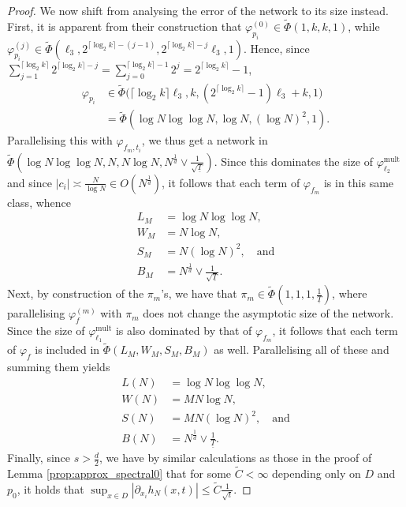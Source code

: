 \documentclass[a4paper, 11pt, headings = small, abstract]{scrartcl}
\begin{document}
\begin{proof}
	We now shift from analysing the error of the network to its size instead.
	First, it is apparent from their construction that $\varphi_{p_i}^{(0)}\in\widetilde{\Phi}(1, k, k, 1)$, while $\varphi_{p_i}^{(j)}\in\widetilde{\Phi}(\ell_3, 2^{\lceil\log_2k\rceil-(j-1)}, 2^{\lceil\log_2k\rceil-j}\ell_3, 1)$.
	Hence, since $\sum_{j=1}^{\lceil\log_2k\rceil}2^{\lceil\log_2k\rceil-j}=\sum_{j=0}^{\lceil\log_2k\rceil-1}2^j=2^{\lceil\log_2k\rceil}-1$,
	\begin{align*}
		\varphi_{p_i}
		&\in\widetilde{\Phi}\Big(\lceil\log_2k\rceil\ell_3, k, (2^{\lceil\log_2k\rceil}-1)\ell_3+k, 1\Big) \\
		&=\widetilde{\Phi}(\log N\log\log N, \log N, (\log N)^2, 1).
	\end{align*}
	Parallelising this with $\varphi_{f_m, t_i}$, we thus get a network in $\widetilde{\Phi}(\log N\log\log N, N, N\log N, N^{\frac{1}{d}}\vee\frac{1}{\sqrt{\underline{T}}})$.
	Since this dominates the size of $\varphi_{\ell_2}^{\mathrm{mult}}$ and since $|c_i|\asymp\frac{N}{\log N}\in O(N^{\frac{1}{d}})$, it follows that each term of $\varphi_{f_m}$ is in this same class, whence
	\begin{align*}
		L_M
		&=\log N\log\log N, \\
		W_M
		&=N\log N, \\
		S_M
		&=N(\log N)^2,\quad\text{and} \\
		B_M
		&=N^{\frac{1}{d}}\vee\frac{1}{\sqrt{\underline{T}}}.
	\end{align*}
	Next, by construction of the $\pi_m$'s, we have that $\pi_m\in\widetilde{\Phi}(1, 1, 1, \frac{1}{\underline{T}})$, where parallelising $\varphi_{f}^{(m)}$ with $\pi_m$ does not change the asymptotic size of the network.
	Since the size of $\varphi_{\ell_1}^{\mathrm{mult}}$ is also dominated by that of $\varphi_{f_m}$, it follows that each term of $\varphi_{f}$ is included in $\widetilde{\Phi}(L_M, W_M, S_M, B_M)$ as well. Parallelising all of these and summing them yields
	\begin{align*}
		L(N)
		&=\log N\log\log N, \\
		W(N)
		&=MN\log N, \\
		S(N)
		&=MN(\log N)^2,\quad\text{and} \\
		B(N)
		&=N^{\frac{1}{d}}\vee\frac{1}{\underline{T}}.
	\end{align*}
    Finally, since $s>\frac{d}{2}$, we have by similar calculations as those in the proof of Lemma \ref{prop:approx_spectral0} that for some $\widetilde{C}<\infty$ depending only on $D$ and $p_0$, it holds that $\sup_{x\in D}|\partial_{x_i}h_N(x, t)|\le\widetilde{C}\frac{1}{\sqrt{t}}$.

\end{proof}
\end{document}
